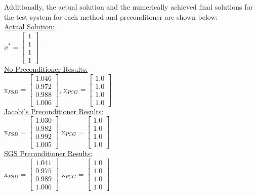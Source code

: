\documentclass[11pt]{article}
\begin{document}
Additionally, the actual solution and the numerically achieved final solutions for the test system for each method and preconditoner are shown below: \\
\underline{Actual Solution:} \\
$x^* =  	\begin{bmatrix}
		1 \\ 
		1 \\
		1 \\ 
		1
		\end{bmatrix}$ \\
\underline{No Preconditioner Results:} \\
x$_{PSD} = \begin{bmatrix}
		1.046 \\
		0.972 \\
		0.988 \\
		1.006
		\end{bmatrix}$, \quad
x$_{PCG} = \begin{bmatrix}
		1.0 \\
		1.0 \\
		1.0 \\
		1.0 
		\end{bmatrix}$ \\
\underline{Jacobi's Preconditioner Results:} \\
x$_{PSD} = \begin{bmatrix}
		1.030 \\
		0.982 \\
		0.992 \\
		1.005 
		\end{bmatrix}$ \quad
x$_{PCG} = \begin{bmatrix}
		1.0 \\
		1.0 \\
		1.0 \\
		1.0 
		\end{bmatrix}$ \\
\underline{SGS Preconditioner Results:} \\
x$_{PSD} = \begin{bmatrix}
		1.041 \\
		0.975 \\
		0.989 \\
		1.006 
		\end{bmatrix}$ \quad
x$_{PCG} = \begin{bmatrix}
		1.0 \\
		1.0 \\
		1.0 \\
		1.0 
		\end{bmatrix}$ \\
\end{document}
